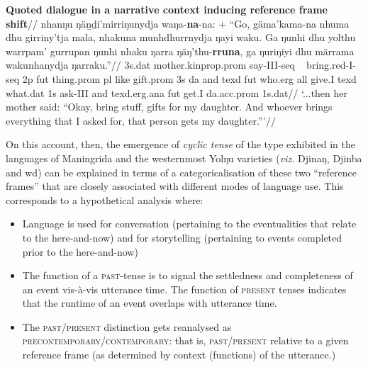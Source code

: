 \ex\begingl\glpreamble \textbf{Quoted dialogue in a narrative context inducing reference frame shift}//
\gla nhanŋu ŋäṉḏi'mirriŋunydja waŋa-\textbf{na}-na: + ``Go, gäma'kama-na nhuma dhu girriny'tja mala, nhakuna munhdhurrnydja ŋayi waku. Ga ŋunhi dhu yolthu warrpam' gurrupan ŋunhi nhaku ŋarra ŋäŋ'thu-\textbf{rruna}, ga ŋuriŋiyi dhu märrama wakunhanydja ŋarraku.''//
\glb 3s.\gls{dat} mother.\gls{kinprop}.\gls{prom} say-\gls{III}-\gls{seq} ~ bring.\gls{red}-\gls{I}-\gls{seq} 2p \gls{fut} thing.\gls{prom} \gls{pl} like gift.\gls{prom} 3s \gls{da} and \gls{texd} \gls{fut} who.\gls{erg} all give.\gls{I} \gls{texd} what.\gls{dat} 1s ask-\gls{III} and \gls{texd}.\gls{erg}.\gls{ana} \gls{fut} get.\gls{I} \gls{da}.\gls{acc}.\gls{prom} 1s.\gls{dat}//
\glft`...then her mother said: ``Okay, bring stuff, gifts for my daughter. And whoever brings everything that I asked for, that person gets my daughter.'''//
\endgl
\xe


 
On this account, then, the emergence of \textit{cyclic tense} of the type exhibited in the languages of Maningrida and the westernmost Yolŋu varieties (\textit{viz.} Djinaŋ, Djinba and \gls{wd}) can be explained in terms of a categoricalisation of these two ``reference frames'' that are closely associated with different modes of language use. This corresponds to a hypothetical analysis where: 
\begin{itemize}
	\item Language is used for conversation (pertaining to the eventualities that relate to the here-and-now) and for storytelling (pertaining to events completed prior to the here-and-now)
	\item The function of a \textsc{past}-tense is to signal the settledness and completeness of an event vis-à-vis utterance time. The function of \textsc{present} tenses indicates that the runtime of an event overlaps with utterance time.
	\item The \textsc{past}/\textsc{present} distinction gets reanalysed as \textsc{precontemporary\slash\hspace{0pt}contemporary}: that is, \textsc{past/present} relative to a given reference frame (as determined by context (functions) of the utterance.)
\end{itemize}

